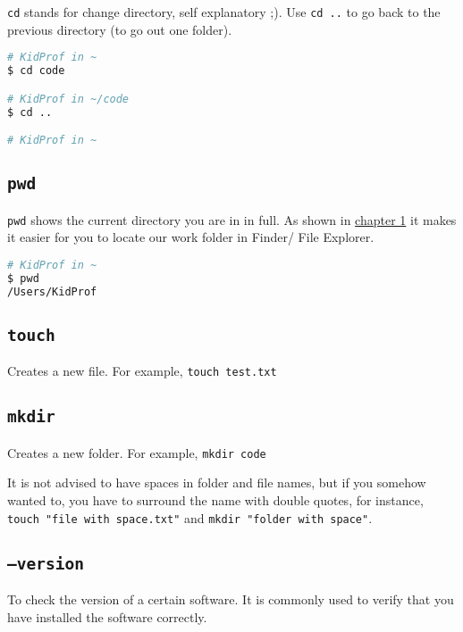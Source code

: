 \texttt{cd} stands for change directory, self explanatory ;). Use \texttt{cd ..} to go back to the previous directory (to go out one folder). 
\vspace{6mm}

\begin{lstlisting}[language=bash]
# KidProf in ~
$ cd code

# KidProf in ~/code
$ cd ..

# KidProf in ~
\end{lstlisting}

\subsection{\texttt{pwd}}

\texttt{pwd} shows the current directory you are in in full. As shown in \hyperref[sec:pwdch1]{chapter 1} it makes it easier for you to locate our work folder in Finder/ File Explorer.
\vspace{6mm}

\begin{lstlisting}[language=bash]
# KidProf in ~
$ pwd
/Users/KidProf
\end{lstlisting}

\subsection{\texttt{touch}}

Creates a new file. For example, \texttt{touch test.txt}

\subsection{\texttt{mkdir}}

Creates a new folder. For example, \texttt{mkdir code}
\vspace{6mm}

It is not advised to have spaces in folder and file names, but if you somehow wanted to, you have to surround the name with double quotes, for instance, \texttt{touch "file with space.txt"} and \texttt{mkdir "folder with space"}.
\subsection{\texttt{--version}}

To check the version of a certain software. It is commonly used to verify that you have installed the software correctly. 

